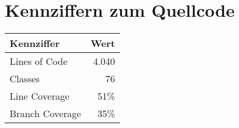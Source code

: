 
\thispagestyle{plain}

\chapter{Kennziffern zum Quellcode}\label{c_metrics}
\begin{tabularx}{\textwidth}{|X|r|} \hline
       \textbf{Kennziffer}  	& \textbf{Wert} \\ \hline

       Lines of Code           		& 4.040\\\hline
       Classes           		& 76\\\hline
       Line Coverage           		& 51\%\\\hline
       Branch Coverage           		& 35\%\\\hline

        
\end{tabularx}

